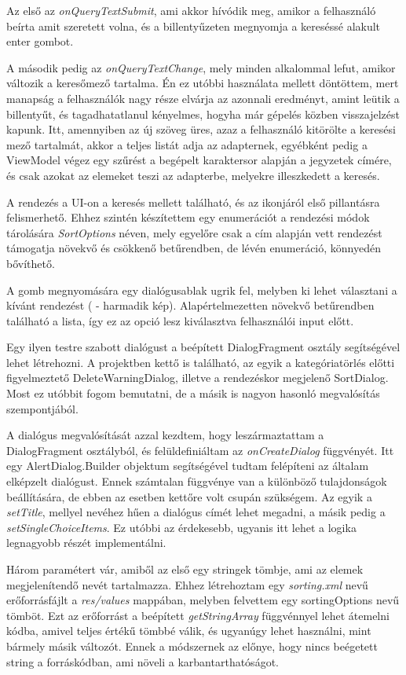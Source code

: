 Az első az \emph{onQueryTextSubmit}, ami akkor hívódik meg, amikor a felhasználó beírta amit szeretett volna, és a billentyűzeten megnyomja a kereséssé alakult enter gombot. 

A második pedig az \emph{onQueryTextChange}, mely minden alkalommal lefut, amikor változik a keresőmező tartalma. Én ez utóbbi használata mellett döntöttem, mert manapság a felhasználók nagy része elvárja az azonnali eredményt, amint leütik a billentyűt, és tagadhatatlanul kényelmes, hogyha már gépelés közben visszajelzést kapunk. Itt, amennyiben az új szöveg üres, azaz a felhasználó kitörölte a keresési mező tartalmát, akkor a teljes listát adja az adapternek, egyébként pedig a ViewModel végez egy szűrést a begépelt karaktersor alapján a jegyzetek címére, és csak azokat az elemeket teszi az adapterbe, melyekre illeszkedett a keresés.

A rendezés a UI-on a keresés mellett található, és az ikonjáról első pillantásra felismerhető. Ehhez szintén készítettem egy enumerációt a rendezési módok tárolására \emph{SortOptions} néven, mely egyelőre csak a cím alapján vett rendezést támogatja növekvő és csökkenő betűrendben, de lévén enumeráció, könnyedén bővíthető. 

A gomb megnyomására egy dialógusablak ugrik fel, melyben ki lehet választani a kívánt rendezést ( - harmadik kép). Alapértelmezetten növekvő betűrendben található a lista, így ez az opció lesz kiválasztva felhasználói input előtt. 

Egy ilyen testre szabott dialógust a beépített DialogFragment osztály segítségével lehet létrehozni. A projektben kettő is található, az egyik a kategóriatörlés előtti figyelmeztető DeleteWarningDialog, illetve a rendezéskor megjelenő SortDialog. Most ez utóbbit fogom bemutatni, de a másik is nagyon hasonló megvalósítás szempontjából. 

A dialógus megvalósítását azzal kezdtem, hogy leszármaztattam a DialogFragment osztályból, és felüldefiniáltam az \emph{onCreateDialog} függvényét. Itt egy AlertDialog.Builder objektum segítségével tudtam felépíteni az általam elképzelt dialógust. Ennek számtalan függvénye van a különböző tulajdonságok beállítására, de ebben az esetben kettőre volt csupán szükségem. Az egyik a \emph{setTitle}, mellyel nevéhez hűen a dialógus címét lehet megadni, a másik pedig a \emph{setSingleChoiceItems}. Ez utóbbi az érdekesebb, ugyanis itt lehet a logika legnagyobb részét implementálni. 

Három paramétert vár, amiből az első egy stringek tömbje, ami az elemek megjelenítendő nevét tartalmazza. Ehhez létrehoztam egy \emph{sorting.xml} nevű erőforrásfájlt a \emph{res/values} mappában, melyben felvettem egy sortingOptions nevű tömböt. Ezt az erőforrást a beépített \emph{getStringArray} függvénnyel lehet átemelni kódba, amivel teljes értékű tömbbé válik, és ugyanúgy lehet használni, mint bármely másik változót. Ennek a módszernek az előnye, hogy nincs beégetett string a forráskódban, ami növeli a karbantarthatóságot. 

